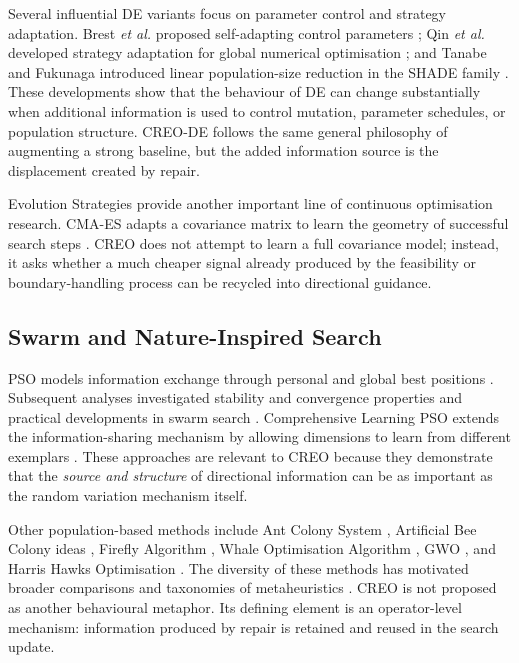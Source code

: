 \documentclass[journal]{IEEEtran}
\begin{document}
Several influential DE variants focus on parameter control and strategy adaptation. Brest \emph{et al.} proposed self-adapting control parameters \cite{brest2006self}; Qin \emph{et al.} developed strategy adaptation for global numerical optimisation \cite{qin2009sade}; and Tanabe and Fukunaga introduced linear population-size reduction in the SHADE family \cite{tanabe2014lshade}. These developments show that the behaviour of DE can change substantially when additional information is used to control mutation, parameter schedules, or population structure. CREO-DE follows the same general philosophy of augmenting a strong baseline, but the added information source is the displacement created by repair.

Evolution Strategies provide another important line of continuous optimisation research. CMA-ES adapts a covariance matrix to learn the geometry of successful search steps \cite{hansen2001cmaes}. CREO does not attempt to learn a full covariance model; instead, it asks whether a much cheaper signal already produced by the feasibility or boundary-handling process can be recycled into directional guidance.

\subsection{Swarm and Nature-Inspired Search}

PSO models information exchange through personal and global best positions \cite{kennedy1995particle}. Subsequent analyses investigated stability and convergence properties \cite{clerc2002particle} and practical developments in swarm search \cite{eberhart2001pso}. Comprehensive Learning PSO extends the information-sharing mechanism by allowing dimensions to learn from different exemplars \cite{liang2006clpso}. These approaches are relevant to CREO because they demonstrate that the \emph{source and structure} of directional information can be as important as the random variation mechanism itself.

Other population-based methods include Ant Colony System \cite{dorigo1997acs}, Artificial Bee Colony ideas \cite{karaboga2005abc}, Firefly Algorithm \cite{yang2009firefly}, Whale Optimisation Algorithm \cite{mirjalili2016woa}, GWO \cite{mirjalili2014grey}, and Harris Hawks Optimisation \cite{heidari2019hho}. The diversity of these methods has motivated broader comparisons and taxonomies of metaheuristics \cite{blum2003metaheuristics}. CREO is not proposed as another behavioural metaphor. Its defining element is an operator-level mechanism: information produced by repair is retained and reused in the search update.
\end{document}
